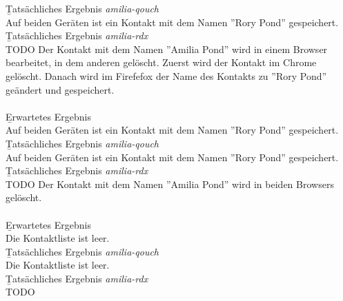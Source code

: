 \b{Tatsächliches Ergebnis \it{amilia-qouch}}\\
Auf beiden Geräten ist ein Kontakt mit dem Namen ''Rory Pond'' gespeichert.\\
\b{Tatsächliches Ergebnis \it{amilia-rdx}}\\
TODO
%
Der Kontakt mit dem Namen ''Amilia Pond'' wird in einem Browser bearbeitet, in dem anderen gelöscht.
Zuerst wird der Kontakt im Chrome gelöscht. 
Danach wird im Firefefox der Name des Kontakts zu ''Rory Pond'' geändert und gespeichert.\\\\
\b{Erwartetes Ergebnis}\\
Auf beiden Geräten ist ein Kontakt mit dem Namen ''Rory Pond'' gespeichert.\\
\b{Tatsächliches Ergebnis \it{amilia-qouch}}\\
Auf beiden Geräten ist ein Kontakt mit dem Namen ''Rory Pond'' gespeichert.\\
\b{Tatsächliches Ergebnis \it{amilia-rdx}}\\
TODO
%
Der Kontakt mit dem Namen ''Amilia Pond'' wird in beiden Browsers gelöscht.\\\\
\b{Erwartetes Ergebnis}\\
Die Kontaktliste ist leer.\\
\b{Tatsächliches Ergebnis \it{amilia-qouch}}\\
Die Kontaktliste ist leer.\\
\b{Tatsächliches Ergebnis \it{amilia-rdx}}\\
TODO